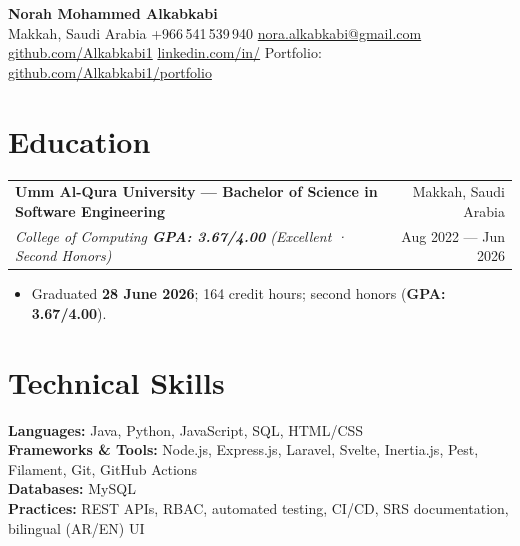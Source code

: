 \documentclass[11pt,a4paper]{article}
\makeatletter
\newcommand{\resumeSubheading}[4]{%
  \vspace{4pt}%
  \begin{tabularx}{\textwidth}{@{}X r@{}}
    \textbf{#1} & \textcolor{muted}{\small #2} \\
    \textit{#3} & \textcolor{muted}{\small #4} \\
  \end{tabularx}%
}
\newcommand{\resumeItem}[1]{\item\small{#1}}
\makeatother
\begin{document}
\begin{center}
  {\LARGE\bfseries Norah Mohammed Alkabkabi}\\[4pt]
  \small
  Makkah, Saudi Arabia \textbar{} +966\,541\,539\,940 \textbar{}
  \href{mailto:nora.alkabkabi@gmail.com}{nora.alkabkabi@gmail.com}\\[2pt]
  \href{https://github.com/Alkabkabi1}{github.com/Alkabkabi1} \textbar{}
  \href{https://linkedin.com/in/}{linkedin.com/in/} \textbar{}
  Portfolio: \href{https://github.com/Alkabkabi1/portfolio}{github.com/Alkabkabi1/portfolio}
\end{center}

\vspace{6pt}

\section{Education}
\resumeSubheading%
  {Umm Al-Qura University — Bachelor of Science in Software Engineering}%
  {Makkah, Saudi Arabia}%
  {College of Computing \textbar{} \textbf{GPA: 3.67/4.00} (Excellent · Second Honors)}%
  {Aug 2022 — Jun 2026}
\vspace{-2pt}
\begin{itemize}[leftmargin=*, nosep, topsep=2pt]
  \resumeItem{Graduated \textbf{28 June 2026}; 164 credit hours; second honors (\textbf{GPA: 3.67/4.00}).}
\end{itemize}

\section{Technical Skills}
\small
\textbf{Languages:} Java, Python, JavaScript, SQL, HTML/CSS\\
\textbf{Frameworks \& Tools:} Node.js, Express.js, Laravel, Svelte, Inertia.js, Pest, Filament, Git, GitHub Actions\\
\textbf{Databases:} MySQL\\
\textbf{Practices:} REST APIs, RBAC, automated testing, CI/CD, SRS documentation, bilingual (AR/EN) UI

\end{document}
